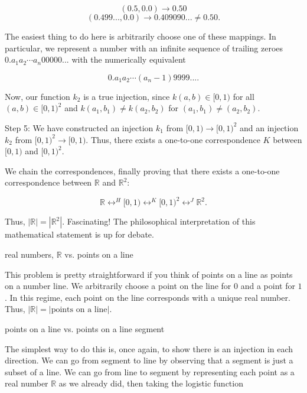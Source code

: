 \documentclass[../key.tex]{subfiles}
\begin{document}
$$(0.5,0.0)\to 0.50$$
$$(0.499...,0.0)\to 0.409090... \neq 0.50.$$

\noindent The easiest thing to do here is arbitrarily choose one of these mappings. In particular, we represent a number with an infinite sequence of trailing zeroes $0.a_1a_2\cdots a_n00000...$ with the numerically equivalent

$$0.a_1a_2\cdots (a_n-1)9999....$$

\noindent Now, our function $k_2$ is a true injection, since $k(a,b)\in [0,1)$ for all $(a,b)\in [0,1)^2$ and $k(a_1,b_1)\neq k(a_2,b_2)$ for $(a_1,b_1)\neq (a_2,b_2)$.

Step 5: We have constructed an injection $k_1$ from $[0,1)\to [0,1)^2$ and an injection $k_2$ from $[0,1)^2\to [0,1)$. Thus, there exists a one-to-one correspondence $K$ between $[0,1)$ and $[0,1)^2$.

We chain the correspondences, finally proving that there exists a one-to-one correspondence between $\mathbb{R}$ and $\mathbb{R}^2$:

$$\mathbb{R} \mathop{\leftrightarrow} ^{H} [0,1) \mathop{\leftrightarrow} ^ {K} [0,1)^2 \mathop{\leftrightarrow} ^ {J} \mathbb{R}^2.$$

\noindent Thus, $|\mathbb{R}|=\left|\mathbb{R}^2\right|$. Fascinating! The philosophical interpretation of this mathematical statement is up for debate.

\begin{inner_problem}
\item real numbers, $\mathbb{R}$ vs. points on a line
\end{inner_problem}

\noindent This problem  is pretty straightforward if you think of points on a line as points on a number line. We arbitrarily choose a point on the line for $0$ and a point for $1$. In this regime, each point on the line corresponds with a unique real number. Thus, $|\mathbb{R}| = |\text{points on a line}|$.

\begin{inner_problem}
\item points on a line vs. points on a line segment
\end{inner_problem}

\noindent The simplest way to do this is, once again, to show there is an injection in each direction. We can go from segment to line by observing that a segment is just a subset of a line. We can go from line to segment by representing each point as a real number $\mathbb{R}$ as we already did, then taking the logistic function
\end{document}
